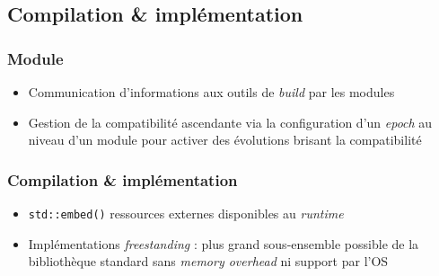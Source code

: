 \documentclass[C++.tex]{subfiles}
\begin{document}
\subsection*{Compilation \& implémentation}
\begin{frame}[fragile]
	\frametitle{Module}
	\begin{itemize}
		\item Communication d'informations aux outils de \textit{build} par les modules
		\item Gestion de la compatibilité ascendante via la configuration d'un \textit{epoch} au niveau d'un module pour activer des évolutions brisant la compatibilité

	\end{itemize}
\end{frame}

\begin{frame}[fragile]
	\frametitle{Compilation \& implémentation}
	\begin{itemize}
		\item \lstinline|std::embed()| ressources externes disponibles au \textit{runtime} 


		\item Implémentations \textit{freestanding} : plus grand sous-ensemble possible de la bibliothèque standard sans \textit{memory overhead} ni support par l'OS

	\end{itemize}
\end{frame}
\end{document}
